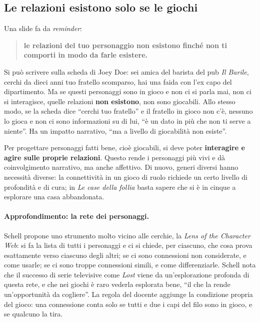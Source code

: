 \subsection{Le relazioni esistono solo se le giochi}

Una slide fa da \emph{reminder}:
\begin{quote}
\textbf{le relazioni del tuo personaggio non esistono finché non ti comporti in
modo da farle esistere.}
\end{quote}
Si può scrivere sulla scheda di Joey Doe: sei amica del barista del pub \emph{Il
Barile}, cerchi da dieci anni tuo fratello scomparso, hai una faida con l'ex capo
del dipartimento. Ma se questi personaggi sono in gioco e non ci si parla mai, non
ci si interagisce, quelle relazioni \textbf{non esistono}, non sono giocabili. Allo
stesso modo, se la scheda dice ``cerchi tuo fratello'' e il fratello in gioco non
c'è, nessuno lo gioca e non ci sono informazioni su di lui, ``è un dato in più che
non ti serve a niente''. Ha un impatto narrativo, ``ma a livello di giocabilità non
esiste''.

Per progettare personaggi fatti bene, cioè giocabili, si deve poter
\textbf{interagire e agire sulle proprie relazioni}. Questo rende i personaggi
più vivi e dà coinvolgimento narrativo, ma anche affettivo. Di nuovo, generi
diversi hanno necessità diverse: la connettività in un gioco di ruolo richiede un
certo livello di profondità e di cura; in \emph{Le case della follia} basta sapere
che si è in cinque a esplorare una casa abbandonata.

\paragraph{Approfondimento: la rete dei personaggi.} Schell propone uno strumento
molto vicino alle cerchie, la \emph{Lens of the Character Web}: si fa la lista di
tutti i personaggi e ci si chiede, per ciascuno, che cosa prova esattamente verso
ciascuno degli altri; se ci sono connessioni non considerate, e come usarle; se
ci sono troppe connessioni simili, e come differenziarle. Schell nota che il
successo di serie televisive come \emph{Lost} viene da un'esplorazione profonda di
questa rete, e che nei giochi è raro vederla esplorata bene, ``il che la rende
un'opportunità da cogliere''. La regola del docente aggiunge la condizione propria
del gioco: una connessione conta solo se tutti e due i capi del filo sono in
gioco, e se qualcuno la tira.

